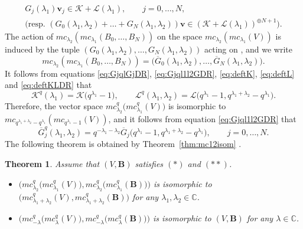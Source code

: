 \documentclass[pdftex]{sigma}
\numberwithin{equation}{section}
\newtheorem{Theorem}{Theorem}[section]
\theoremstyle{definition}
\begin{document}
\begin{gather}
 G_j (\lambda _1 ) \mathbf{v}_j \in \mathcal{K} + \mathcal{L} (\lambda _1 ) , \qquad j=0,\dots ,N , \nonumber\\
 \bigl(\mbox{resp. } ( G_0 (\lambda _1, \lambda _2 ) + \dots + G_N (\lambda _1, \lambda _2 )) \mathbf{v} \in (\mathcal{K} + \mathcal{L} (\lambda _1 ))^{\oplus N+1} \bigr). \label{eq:deftKLDR}
\end{gather}
The action of $mc _{\lambda _2} (mc_{\lambda _1} (B_0, \dots ,B_N)) $ on the space $mc _{\lambda _2} (mc _{\lambda _1} (V))$ is induced by the tuple $(G_0 (\lambda _1, \lambda _2 ), \dots , G_N (\lambda _1, \lambda _2 ) )$ acting on , and we write
\begin{equation} \label{eq:mcmc}
mc _{\lambda _2} (mc_{\lambda _1} (B_0, \dots ,B_N)) = \bigl(\overline{G}_0 (\lambda _1, \lambda _2 ), \dots , \overline{G}_N (\lambda _1, \lambda _2 ) \bigr).
\end{equation}
It follows from equations \eqref{eq:GjqlGjDR}, \eqref{eq:Gjql1l2GDR}, \eqref{eq:deftK}, \eqref{eq:deftL} and \eqref{eq:deftKLDR} that
\begin{equation*}
 \mathcal{K}^{q} (\lambda _1) = \mathcal{K} \bigl(q^{\lambda _1} -1 \bigr), \qquad \mathcal{L}^{q} ( \lambda _1, \lambda _2 ) = \mathcal{L} \bigl(q^{\lambda _1} -1 , q^{\lambda _1 + \lambda _2} - q^{\lambda _1 } \bigr).
\end{equation*}
Therefore, the vector space $mc _{\lambda _2} ^{q} \bigl(mc _{\lambda _1} ^{q} (V)\bigr) $ is isomorphic to $mc _{q^{\lambda _1 + \lambda _2} - q^{\lambda _1 }} (mc _{q^{\lambda _1} -1 } (V)) $, and it follows from equation \eqref{eq:Gjql1l2GDR} that
\begin{equation}
\overline{G}_j^{q} (\lambda _1, \lambda _2 ) = q^{-\lambda _1 -\lambda _2} \overline{G}_j \bigl(q^{\lambda _1} -1 , q^{\lambda _1 + \lambda _2} - q^{\lambda _1 } \bigr) ,\qquad j=0,\dots ,N.
\label{eq:Gjql1l2GDRb}
\end{equation}
The following theorem is obtained by Theorem~\ref{thm:mc12isom} \cite[Theorem 3.5]{DR1}.
\begin{Theorem} \label{thm:qmc12isom}
Assume that $(V ,\boldsymbol{B}) $ satisfies $(*)$ and $(**)$.
\begin{itemize}\itemsep=0pt
\item[$(i)$] $\bigl(mc _{\lambda _2} ^{q} \bigl(mc _{\lambda _1} ^{q} (V)\bigr), mc _{\lambda _2} ^{q} \bigl(mc _{\lambda _1} ^{q} (\boldsymbol{B} )\bigr)\bigr)$ is isomorphic to $\bigl(mc _{\lambda _1 +\lambda _2} ^{q} (V), mc _{\lambda _1 +\lambda _2} ^{q} (\boldsymbol{B} )\bigr)$ for any $\lambda _1, \lambda _2 \in \mathbb{C} $.

\item[$(ii)$] $\bigl(mc _{-\lambda } ^{q} \bigl(mc _{\lambda } ^{q} (V)\bigr), mc _{-\lambda } ^{q} \bigl(mc _{\lambda } ^{q} (\boldsymbol{B} )\bigr)\bigr) $ is isomorphic to $(V, \boldsymbol{B} )$ for any $\lambda \in \mathbb{C} $.
\end{itemize}
\end{Theorem}
\end{document}
